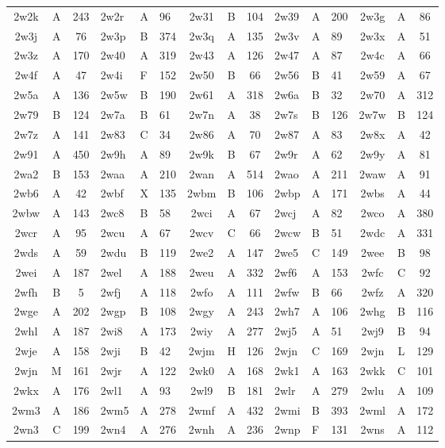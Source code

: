 \begin{longtable}{|c|c|c| a|a|a| c|c|c| a|a|a| c|c|c|}
2w2k & A & 243 & 2w2r & A & 96 & 2w31 & B & 104 & 2w39 & A & 200 & 2w3g & A & 86\\
2w3j & A & 76 & 2w3p & B & 374 & 2w3q & A & 135 & 2w3v & A & 89 & 2w3x & A & 51\\
2w3z & A & 170 & 2w40 & A & 319 & 2w43 & A & 126 & 2w47 & A & 87 & 2w4c & A & 66\\
2w4f & A & 47 & 2w4i & F & 152 & 2w50 & B & 66 & 2w56 & B & 41 & 2w59 & A & 67\\
2w5a & A & 136 & 2w5w & B & 190 & 2w61 & A & 318 & 2w6a & B & 32 & 2w70 & A & 312\\
2w79 & B & 124 & 2w7a & B & 61 & 2w7n & A & 38 & 2w7s & B & 126 & 2w7w & B & 124\\
2w7z & A & 141 & 2w83 & C & 34 & 2w86 & A & 70 & 2w87 & A & 83 & 2w8x & A & 42\\
2w91 & A & 450 & 2w9h & A & 89 & 2w9k & B & 67 & 2w9r & A & 62 & 2w9y & A & 81\\
2wa2 & B & 153 & 2waa & A & 210 & 2wan & A & 514 & 2wao & A & 211 & 2waw & A & 91\\
2wb6 & A & 42 & 2wbf & X & 135 & 2wbm & B & 106 & 2wbp & A & 171 & 2wbs & A & 44\\
2wbw & A & 143 & 2wc8 & B & 58 & 2wci & A & 67 & 2wcj & A & 82 & 2wco & A & 380\\
2wcr & A & 95 & 2wcu & A & 67 & 2wcv & C & 66 & 2wcw & B & 51 & 2wdc & A & 331\\
2wds & A & 59 & 2wdu & B & 119 & 2we2 & A & 147 & 2we5 & C & 149 & 2wee & B & 98\\
2wei & A & 187 & 2wel & A & 188 & 2weu & A & 332 & 2wf6 & A & 153 & 2wfc & C & 92\\
2wfh & B & 5 & 2wfj & A & 118 & 2wfo & A & 111 & 2wfw & B & 66 & 2wfz & A & 320\\
2wge & A & 202 & 2wgp & B & 108 & 2wgy & A & 243 & 2wh7 & A & 106 & 2whg & B & 116\\
2whl & A & 187 & 2wi8 & A & 173 & 2wiy & A & 277 & 2wj5 & A & 51 & 2wj9 & B & 94\\
2wje & A & 158 & 2wji & B & 42 & 2wjm & H & 126 & 2wjn & C & 169 & 2wjn & L & 129\\
2wjn & M & 161 & 2wjr & A & 122 & 2wk0 & A & 168 & 2wk1 & A & 163 & 2wkk & C & 101\\
2wkx & A & 176 & 2wl1 & A & 93 & 2wl9 & B & 181 & 2wlr & A & 279 & 2wlu & A & 109\\
2wm3 & A & 186 & 2wm5 & A & 278 & 2wmf & A & 432 & 2wmi & B & 393 & 2wml & A & 172\\
2wn3 & C & 199 & 2wn4 & A & 276 & 2wnh & A & 236 & 2wnp & F & 131 & 2wns & A & 112\\

\end{longtable}
